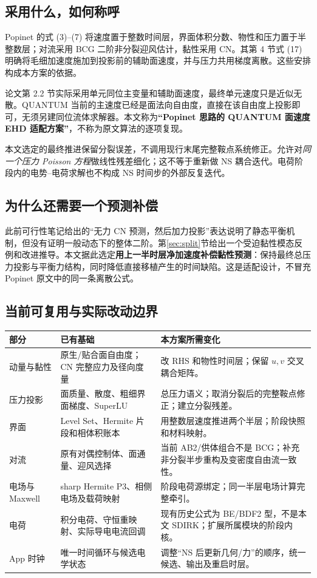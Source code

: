 \documentclass[UTF8,a4paper,11pt,fontset=fandol]{ctexart}
\numberwithin{equation}{section}
\begin{document}
\subsection{采用什么，如何称呼}
Popinet 的式 (3)--(7) 将速度置于整数时间层，界面体积分数、物性和压力置于半整数层；对流采用 BCG 二阶非分裂迎风估计，黏性采用 CN。其第 4 节式 (17) 明确将毛细加速度施加到投影前的辅助面速度，并与压力共用梯度离散\cite{popinet}。这些安排构成本方案的依据。

论文第 2.2 节实际采用单元同位主变量和辅助面速度，最终单元速度只是近似无散。QUANTUM 当前的主速度已经是面法向自由度，直接在该自由度上投影即可，无须另建同位流体求解器。本文称为\textbf{“Popinet 思路的 QUANTUM 面速度 EHD 适配方案”}，不称为原文算法的逐项复现。

本文选定的最终推进保留分裂误差，不调用现行末尾完整鞍点系统修正。允许对\emph{同一个压力 Poisson 方程}做线性残差细化；这不等于重新做 NS 耦合迭代。电荷阶段内的电势--电荷求解也不构成 NS 时间步的外部反复迭代。

\subsection{为什么还需要一个预测补偿}
此前可行性笔记给出的“无力 CN 预测，然后加力投影”表达说明了静态平衡机制，但没有证明一般动态下的整体二阶。第\ref{sec:split}节给出一个受迫黏性模态反例和改进推导。本文据此选定\textbf{用上一半时层净加速度补偿黏性预测}：保持最终总压力投影与平衡力结构，同时降低直接移植产生的时间缺陷。这是适配设计，不冒充 Popinet 原文中的同一条离散公式。

\subsection{当前可复用与实际改动边界}
\begin{longtable}{@{}p{}p{}p{}@{}}
\toprule 部分 & 已有基础 & 本方案所需变化\\\midrule\endhead
动量与黏性 & 原生/贴合面自由度；CN 完整应力及径向度量 & 改 RHS 和物性时间层；保留 $u,v$ 交叉耦合矩阵。\\
压力投影 & 面质量、散度、粗细界面梯度、SuperLU & 总压力语义；取消分裂后的完整鞍点修正；建立分裂残差。\\
界面 & Level Set、Hermite 片段和相体积账本 & 用整数层速度推进两个半层；阶段快照和材料映射。\\
对流 & 原有对偶控制体、面通量、迎风选择 & 当前 AB2/供体组合不是 BCG；补充非分裂半步重构及变密度自由流一致性。\\
电场与 Maxwell & sharp Hermite P3、相侧电场及载荷映射 & 阶段电荷源绑定；同一半层电场计算完整牵引。\\
电荷 & 积分电荷、守恒重映射、实际导电电流回调 & 现有历史公式为 BE/BDF2 型，不是本文 SDIRK；扩展所属模块的阶段内核。\\
App 时钟 & 唯一时间循环与候选电学状态 & 调整“NS 后更新几何/力”的顺序，统一候选、输出及重启时层。\\
\bottomrule
\end{longtable}
\end{document}
